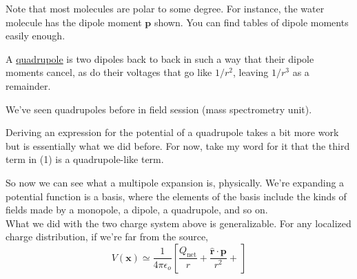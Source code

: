 \documentclass{article}
\numberwithin{equation}{section}
\newcommand{\rhat}{\mathbf{\hat{r}}}
\newcommand{\bunny}[1][]{
    \tikz \fill [scale=1ex/500,yscale=1,#1] svg "M3831 8683 c-70 -71 -235 -358 -326 -567 -168 -385 -252 -748 -275 -1181 -5 -104 -9 -199 -7 -209 2 -16 -10 -21 -88 -36 -158 -31 -407 -112 -530 -173 -117 -58 -239 -150 -365 -277 -178 -177 -305 -366 -407 -604 -44 -102 -55 -118 -136 -201 -110 -113 -148 -183 -154 -288 -4 -53 0 -88 14 -132 12 -37 16 -70 12 -85 -4 -14 -7 -62 -8 -107 -3 -225 125 -386 369 -461 66 -20 157 -35 282 -47 l68 -7 -25 -47 c-41 -81 -59 -197 -52 -341 10 -200 66 -413 174 -660 153 -347 352 -632 640 -914 l104 -102 9 -95 c13 -131 12 -378 -1 -441 -25 -115 -92 -205 -180 -242 -138 -58 -168 -77 -220 -139 -92 -109 -110 -180 -63 -237 63 -75 165 -100 429 -107 159 -4 215 -2 275 11 267 57 455 273 539 619 20 84 29 107 41 103 8 -3 89 -37 179 -76 197 -86 466 -177 651 -220 74 -18 142 -34 150 -37 8 -3 -14 -15 -50 -28 -257 -88 -340 -205 -227 -319 48 -47 82 -58 257 -78 225 -26 1652 -9 1850 23 75 12 154 51 184 92 22 30 23 43 15 268 -3 65 0 83 25 133 50 102 131 161 255 187 46 9 67 8 150 -11 230 -54 428 -7 556 131 71 77 99 149 92 240 -7 115 -65 203 -185 282 -218 145 -282 308 -264 665 30 563 -100 1035 -383 1397 -78 99 -236 254 -335 327 -319 238 -731 392 -1245 468 -301 44 -438 49 -1090 37 -69 -2 -107 3 -160 20 l-70 22 3 238 c3 183 0 265 -12 356 -18 123 -53 275 -81 340 -16 38 -16 40 9 70 456 567 686 1088 725 1647 21 289 -41 691 -116 749 -28 23 -72 27 -106 10 -63 -31 -322 -342 -452 -541 -38 -59 -73 -108 -77 -108 -5 0 -8 11 -8 24 0 14 -9 74 -21 133 -44 228 -158 517 -217 547 -50 26 -80 20 -121 -21z";
}
\begin{document}
\begin{minipage}{0.4\textwidth}
\begin{flushleft}
\begin{figure}[H]
\label{fig:4:water}
\end{figure}
\end{flushleft}
\end{minipage}
\hspace{-1cm}
\begin{minipage}{0.6\textwidth}
\begin{flushright}
\parbox[c]{\textwidth}{\begin{flushleft} Note that most molecules are polar to some degree. For instance, the water molecule has the dipole moment $\bm{p}$ shown. You can find tables of dipole moments easily enough. \end{flushleft}}
\end{flushright}
\end{minipage}

A \underline{quadrupole} is two dipoles back to back in such a way that their dipole moments cancel, as do their voltages that go like $1/r^2$, leaving $1/r^3$ as a remainder.

We've seen quadrupoles before in field session (mass spectrometry unit).

Deriving an expression for the potential of a quadrupole takes a bit more work but is essentially what we did before. For now, take my word for it that the third term in (1) is a quadrupole-like term.

So now we can see what a multipole expansion is, physically. We're expanding a potential function is a basis, where the elements of the basis include the kinds of fields made by a monopole, a dipole, a quadrupole, and so on. \\

What we did with the two charge system above is generalizable. For any localized charge distribution, if we're far from the source,
\begin{equation*}
    V(\bm{x}) \simeq \frac{1}{4\pi\epsilon_o} \left[ \frac{Q_{\text{net}}}{r} + \frac{\rhat \cdot \bm{p}}{r^2} + \frac{}{} \right]
\end{equation*}
\end{document}
